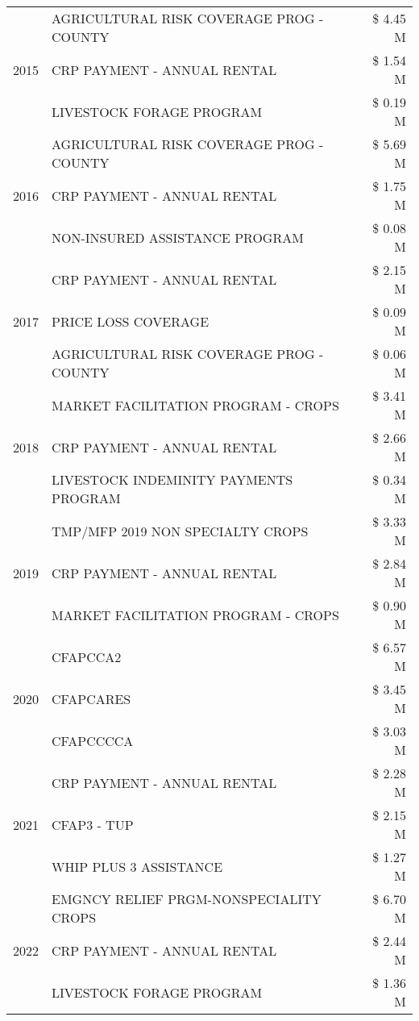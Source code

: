 \begin{tabular}{llr}
\cline{1-3}
\multirow[t]{3}{*}{2015} & AGRICULTURAL RISK COVERAGE PROG - COUNTY & \$ 4.45 M \\
 & CRP PAYMENT - ANNUAL RENTAL & \$ 1.54 M \\
 & LIVESTOCK FORAGE PROGRAM & \$ 0.19 M \\
\cline{1-3}
\multirow[t]{3}{*}{2016} & AGRICULTURAL RISK COVERAGE PROG - COUNTY & \$ 5.69 M \\
 & CRP PAYMENT - ANNUAL RENTAL & \$ 1.75 M \\
 & NON-INSURED ASSISTANCE PROGRAM & \$ 0.08 M \\
\cline{1-3}
\multirow[t]{3}{*}{2017} & CRP PAYMENT - ANNUAL RENTAL & \$ 2.15 M \\
 & PRICE LOSS COVERAGE & \$ 0.09 M \\
 & AGRICULTURAL RISK COVERAGE PROG - COUNTY & \$ 0.06 M \\
\cline{1-3}
\multirow[t]{3}{*}{2018} & MARKET FACILITATION PROGRAM - CROPS & \$ 3.41 M \\
 & CRP PAYMENT - ANNUAL RENTAL & \$ 2.66 M \\
 & LIVESTOCK INDEMINITY PAYMENTS PROGRAM & \$ 0.34 M \\
\cline{1-3}
\multirow[t]{3}{*}{2019} & TMP/MFP 2019 NON SPECIALTY CROPS & \$ 3.33 M \\
 & CRP PAYMENT - ANNUAL RENTAL & \$ 2.84 M \\
 & MARKET FACILITATION PROGRAM - CROPS & \$ 0.90 M \\
\cline{1-3}
\multirow[t]{3}{*}{2020} & CFAPCCA2 & \$ 6.57 M \\
 & CFAPCARES & \$ 3.45 M \\
 & CFAPCCCCA & \$ 3.03 M \\
\cline{1-3}
\multirow[t]{3}{*}{2021} & CRP PAYMENT - ANNUAL RENTAL & \$ 2.28 M \\
 & CFAP3 - TUP & \$ 2.15 M \\
 & WHIP PLUS 3 ASSISTANCE & \$ 1.27 M \\
\cline{1-3}
\multirow[t]{3}{*}{2022} & EMGNCY RELIEF PRGM-NONSPECIALITY CROPS & \$ 6.70 M \\
 & CRP PAYMENT - ANNUAL RENTAL & \$ 2.44 M \\
 & LIVESTOCK FORAGE PROGRAM & \$ 1.36 M \\
\cline{1-3}
\bottomrule
\end{tabular}
